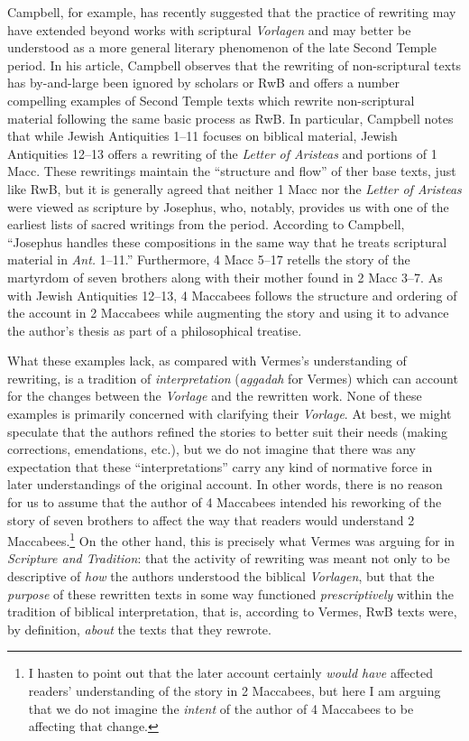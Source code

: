 Campbell, for example, has recently suggested that the practice of
rewriting may have extended beyond works with scriptural \emph{Vorlagen}
and may better be understood as a more general literary phenomenon of
the late Second Temple period.\autocite{campbell_zsengeller2014} In his
article, Campbell observes that the rewriting of non-scriptural texts
has by-and-large been ignored by scholars or RwB and offers a number
compelling examples of Second Temple texts which rewrite non-scriptural
material following the same basic process as RwB. In particular,
Campbell notes that while Jewish Antiquities 1--11 focuses on biblical
material, Jewish Antiquities 12--13 offers a rewriting of the
\emph{Letter of Aristeas} and portions of 1 Macc. These rewritings
maintain the ``structure and flow'' of ther base texts, just like RwB,
but it is generally agreed that neither 1 Macc nor the \emph{Letter of
Aristeas} were viewed as scripture by Josephus, who, notably, provides
us with one of the earliest lists of sacred writings from the
period.\autocite{mason2002_mcdonald-sanders2002} According to Campbell,
``Josephus handles these compositions in the same way that he treats
scriptural material in \emph{Ant.}
1--11.''\autocites[70]{campbell_zsengeller2014}[See
also][126]{mason2002_mcdonald-sanders2002} Furthermore, 4 Macc 5--17
retells the story of the martyrdom of seven brothers along with their
mother found in 2 Macc 3--7. As with Jewish Antiquities 12--13, 4
Maccabees follows the structure and ordering of the account in 2
Maccabees while augmenting the story and using it to advance the
author's thesis as part of a philosophical treatise.

What these examples lack, as compared with Vermes's understanding of
rewriting, is a tradition of \emph{interpretation} (\emph{aggadah} for
Vermes) which can account for the changes between the \emph{Vorlage} and
the rewritten work. None of these examples is primarily concerned with
clarifying their \emph{Vorlage}. At best, we might speculate that the
authors refined the stories to better suit their needs (making
corrections, emendations, etc.), but we do not imagine that there was
any expectation that these ``interpretations'' carry any kind of
normative force in later understandings of the original account. In
other words, there is no reason for us to assume that the author of 4
Maccabees intended his reworking of the story of seven brothers to
affect the way that readers would understand 2 Maccabees.\footnote{I
  hasten to point out that the later account certainly \emph{would have}
  affected readers' understanding of the story in 2 Maccabees, but here
  I am arguing that we do not imagine the \emph{intent} of the author of
  4 Maccabees to be affecting that change.} On the other hand, this is
precisely what Vermes was arguing for in \emph{Scripture and Tradition}:
that the activity of rewriting was meant not only to be descriptive of
\emph{how} the authors understood the biblical \emph{Vorlagen}, but that
the \emph{purpose} of these rewritten texts in some way functioned
\emph{prescriptively} within the tradition of biblical interpretation,
that is, according to Vermes, RwB texts were, by definition,
\emph{about} the texts that they rewrote.

